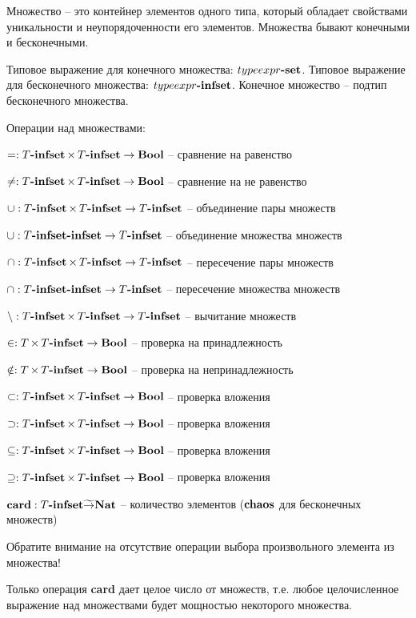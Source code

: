 

Множество -- это контейнер элементов одного типа, который обладает свойствами уникальности и неупорядоченности его элементов. Множества бывают конечными и бесконечными.

Типовое выражение для конечного множества: $typeexpr\textbf{-set}$. Типовое выражение для бесконечного множества: $typeexpr\textbf{-infset}$. Конечное множество -- подтип бесконечного множества.

Операции над множествами:
\begin{list}{}{}
\item $= : T\textbf{-infset} \mathop{\times} T\textbf{-infset} \rightarrow \textbf{Bool}$ -- сравнение на равенство
\item $\neq : T\textbf{-infset} \mathop{\times} T\textbf{-infset} \rightarrow \textbf{Bool}$ -- сравнение на не равенство
\item $\mathop{\cup}: T\textbf{-infset} \mathop{\times} T\textbf{-infset} \rightarrow T\textbf{-infset}$ -- объединение пары множеств
\item $\mathop{\cup}: T\textbf{-infset}\textbf{-infset} \rightarrow T\textbf{-infset}$ -- объединение множества множеств
\item $\mathop{\cap}: T\textbf{-infset} \mathop{\times} T\textbf{-infset} \rightarrow T\textbf{-infset}$ -- пересечение пары множеств
\item $\mathop{\cap}: T\textbf{-infset}\textbf{-infset} \rightarrow T\textbf{-infset}$ -- пересечение множества множеств
\item $\mathop{\setminus}: T\textbf{-infset} \mathop{\times} T\textbf{-infset} \rightarrow T\textbf{-infset}$ -- вычитание множеств
\item $\in: T \mathop{\times} T\textbf{-infset} \rightarrow \textbf{Bool}$ -- проверка на принадлежность
\item $\notin: T \mathop{\times} T\textbf{-infset} \rightarrow \textbf{Bool}$ -- проверка на непринадлежность
\item $\subset: T\textbf{-infset} \mathop{\times} T\textbf{-infset} \rightarrow \textbf{Bool}$ -- проверка вложения
\item $\supset: T\textbf{-infset} \mathop{\times} T\textbf{-infset} \rightarrow \textbf{Bool}$ -- проверка вложения
\item $\subseteq: T\textbf{-infset} \mathop{\times} T\textbf{-infset} \rightarrow \textbf{Bool}$ -- проверка вложения
\item $\supseteq: T\textbf{-infset} \mathop{\times} T\textbf{-infset} \rightarrow \textbf{Bool}$ -- проверка вложения
\item $\mathop{\textbf{card}}: T\textbf{-infset} \widetilde{\rightarrow} \textbf{Nat}$ -- количество элементов
($\textbf{chaos}$ для бесконечных множеств)
\end{list}

Обратите внимание на отсутствие операции выбора произвольного элемента из множества!

Только операция \textbf{card} дает целое число от множеств, т.е. любое целочисленное выражение над множествами будет мощностью некоторого множества.

